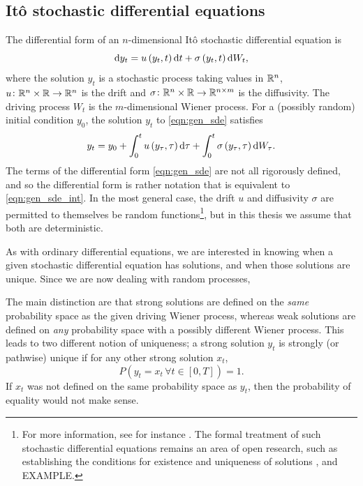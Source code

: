 \subsection{It\^o stochastic differential equations}
The differential form of an \(n\)-dimensional It\^o stochastic differential equation is
\begin{equation}
	\dif y_t = u\left(y_t, t\right)\dif t + \sigma\left(y_t, t\right)\dif W_t,
	\label{eqn:gen_sde}
\end{equation}
where the solution \(y_t\) is a stochastic process taking values in \(\mathbb{R}^n\), \(u\colon \mathbb{R}^n \times \mathbb{R} \to \mathbb{R}^n\) is the drift and \(\sigma\colon \mathbb{R}^n \times \mathbb{R} \to \mathbb{R}^{n\times m}\) is the diffusivity.
The driving process \(W_t\) is the \(m\)-dimensional Wiener process.
For a (possibly random) initial condition \(y_0\), the solution \(y_t\) to \eqref{eqn:gen_sde} satisfies
\begin{equation}
	y_t = y_0 + \int_0^t{u\left(y_\tau, \tau\right)\dif\tau} + \int_0^t{\sigma\left(y_\tau, \tau\right)\dif W_\tau}.
	\label{eqn:gen_sde_int}
\end{equation}
The terms of the differential form \eqref{eqn:gen_sde} are not all rigorously defined, and so the differential form is rather notation that is equivalent to \eqref{eqn:gen_sde_int}.
In the most general case, the drift \(u\) and diffusivity \(\sigma\) are permitted to themselves be random functions\footnote{For more information, see for instance \citet{KallianpurSundar_2014_StochasticAnalysisDiffusion}.
	The formal treatment of such stochastic differential equations remains an area of open research, such as establishing the conditions for existence and uniqueness of solutions \citehere, and EXAMPLE.}, but in this thesis we assume that both are deterministic.


As with ordinary differential equations, we are interested in knowing when a given stochastic differential equation has solutions, and when those solutions are unique.
Since we are now dealing with random processes,

The main distinction are that strong solutions are defined on the \emph{same} probability space as the given driving Wiener process, whereas weak solutions are defined on \emph{any} probability space with a possibly different Wiener process.
This leads to two different notion of uniqueness; a strong solution \(y_t\) is strongly (or pathwise) unique if for any other strong solution \(x_t\),
\[
	P\left(y_t = x_t \, \forall t \in [0,T]\right) = 1.
\]
If \(x_t\) was not defined on the same probability space as \(y_t\), then the probability of equality would not make sense.

